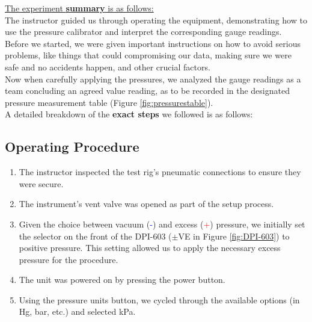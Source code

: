 \documentclass{article}
\begin{document}
	\underline{The experiment \textbf{summary} is as follows:}\\[1em]
	\noindent
The instructor guided us through operating the equipment, demonstrating how to use the pressure calibrator and interpret the corresponding gauge readings.\\[1em] 
Before we started, we were given important instructions on how to avoid serious problems, like things that could compromising our data, making sure we were safe and no accidents happen, and other crucial factors.\\[1em] 
Now when carefully applying the pressures, we analyzed the gauge readings as a team concluding an agreed value reading, as to be recorded in the designated pressure measurement table (Figure \ref{fig:pressurestable}).\\[1em]
A detailed breakdown of the \textbf{exact steps} we followed is as follows:
\newpage
{}
\begin{minipage}{0.5\textwidth}	
	\subsection{Operating Procedure}
	\begin{enumerate}[left=0in,itemsep=2mm]
	    \item The instructor inspected the test rig’s pneumatic connections to ensure they were secure.  
		\item The instrument’s vent valve was opened as part of the setup process.  
		\item Given the choice between vacuum (\textsf{\textcolor{blue}{-}}) and excess (\textsf{\textcolor{red}{+}}) pressure, we initially set the selector on the front of the DPI-603 ($\pm$VE in Figure \ref{fig:DPI-603}) to positive pressure. This setting allowed us to apply the necessary excess pressure for the procedure.  
		\item The unit was powered on by pressing the power button.  
		\item Using the pressure units button, we cycled through the available options (in Hg, bar, etc.) and selected kPa.  
	\end{enumerate}
\end{minipage}\hfill
\end{document}
